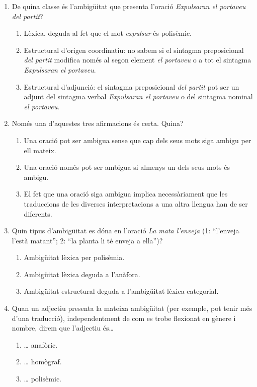 \begin{enumerate}
\item De quina classe és l'ambigüitat que presenta l'oració
  \emph{Expulsaran el portaveu del partit}?
  \begin{enumerate}
  \item Lèxica, deguda al fet que el mot \emph{expulsar} és polisèmic.
  \item Estructural d'origen coordinatiu: no sabem si el sintagma
    preposicional \emph{del partit} modifica només al segon element
    \emph{el portaveu} o a tot el sintagma \emph{Expulsaran el
      portaveu}.
  \item Estructural d'adjunció: el sintagma preposicional \emph{del
      partit} pot ser un adjunt del sintagma verbal \emph{Expulsaran
      el portaveu} o del sintagma nominal \emph{el portaveu}.
  \end{enumerate}

\item Només una d'aquestes tres afirmacions és certa. Quina?
  \begin{enumerate}
  \item Una oració pot ser ambigua sense que cap dels seus mots siga
    ambigu per ell mateix.
  \item Una oració només pot ser ambigua si almenys un dels seus mots
    és ambigu.
  \item El fet que una oració siga ambigua implica necessàriament que
    les traduccions de les diverses interpretacions a una altra
    llengua han de ser diferents.
  \end{enumerate}

\item Quin tipus d'ambigüitat es dóna en l'oració \emph{La mata
    l'enveja} (1: ``l'enveja l'està matant''; 2: ``la planta li té
  enveja a ella'')?
  \begin{enumerate}
  \item Ambigüitat lèxica per polisèmia.
  \item Ambigüitat lèxica deguda a l'anàfora.
  \item Ambigüitat estructural deguda a l'ambigüitat lèxica
    categorial.
  \end{enumerate}

\item Quan un adjectiu presenta la mateixa ambigüitat (per exemple,
  pot tenir més d'una traducció), independentment de com es trobe
  flexionat en gènere i nombre, direm que l'adjectiu és{\ldots}
  \begin{enumerate}
  \item {\ldots} anafòric.
  \item {\ldots} homògraf.
  \item {\ldots} polisèmic.
  \end{enumerate}
 

\end{enumerate}
